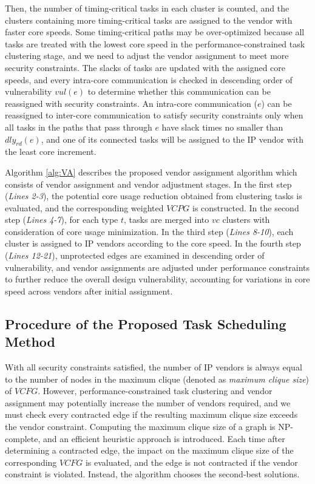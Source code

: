 \documentclass[10pt,journal, compsoc]{IEEEtran}
\begin{document}
Then, the number of timing-critical tasks in each cluster is counted, and the clusters containing more timing-critical tasks are assigned to the vendor with faster core speeds. Some timing-critical paths may be over-optimized because all tasks are treated with the lowest core speed in the performance-constrained task clustering stage, and we need to adjust the vendor assignment to meet more security constraints. The slacks of tasks are updated with the assigned core speeds, and every intra-core communication is checked in descending order of vulnerability $vul(e)$ to determine whether this communication can be reassigned with security constraints. An intra-core communication ($e$) can be reassigned to inter-core communication to satisfy security constraints only when all tasks in the paths that pass through $e$ have slack times no smaller than $dly_{rd}(e)$, and one of its connected tasks will be assigned to the IP vendor with the least core increment.%


\color{blue}
Algorithm \ref{alg:VA} describes the proposed vendor assignment algorithm which consists of vendor assignment and vendor adjustment stages. In the first step (\textit{Lines 2-3}), the potential core usage reduction obtained from clustering tasks is evaluated, and the corresponding weighted $VCPG$ is constructed. In the second step (\textit{Lines 4-7}), for each type $t$, tasks are merged into $vc$ clusters with consideration of core usage minimization. In the third step (\textit{Lines 8-10}), each cluster is assigned to IP vendors according to the core speed. In the fourth step (\textit{Lines 12-21}), unprotected edges are examined in descending order of vulnerability, and vendor assignments are adjusted under performance constraints to further reduce the overall design vulnerability, accounting for variations in core speed across vendors after initial assignment.

\color{black}


\subsection{Procedure of the Proposed Task Scheduling Method}

With all security constraints satisfied, the number of IP vendors is always equal to the number of nodes in the maximum clique (denoted as \textit{maximum clique size}) of $VCFG$. However, performance-constrained task clustering and vendor assignment may potentially increase the number of vendors required, and we must check every contracted edge if the resulting maximum clique size exceeds the vendor constraint. Computing the maximum clique size of a graph is NP-complete, and an efficient heuristic approach \cite{article:CL} is introduced. Each time after determining a contracted edge, the impact on the maximum clique size of the corresponding $VCFG$ is evaluated, and the edge is not contracted if the vendor constraint is violated. Instead, the algorithm chooses the second-best solutions.
\end{document}
